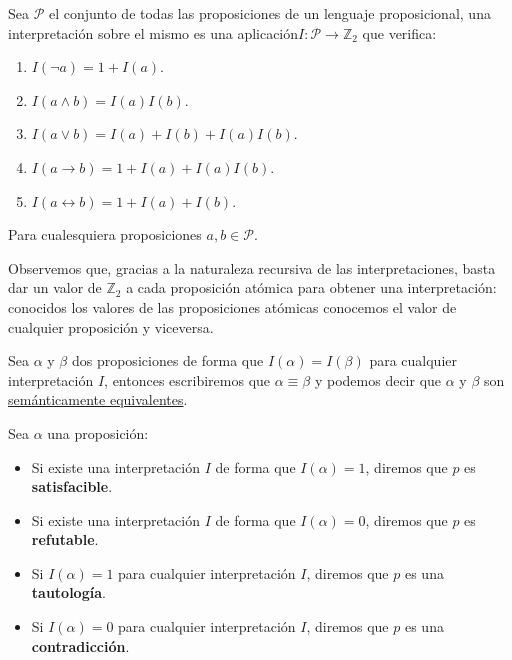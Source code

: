 \begin{definicion}[Interpretación]
    Sea $\mathcal{P}$ el conjunto de todas las proposiciones de un lenguaje proposicional, una interpretación sobre el mismo es una aplicación\newline $I:\mathcal{P}\rightarrow\mathbb{Z}_2$ que verifica:
    \begin{enumerate}
        \item $I(\lnot a) = 1+ I(a)$.
        \item $I(a\land b) = I(a)I(b)$.
        \item $I(a\lor b) = I(a) + I(b) + I(a)I(b)$.
        \item $I(a\to b) = 1 + I(a) + I(a)I(b)$.
        \item $I(a\leftrightarrow b) = 1 + I(a) + I(b)$.
    \end{enumerate}
    Para cualesquiera proposiciones $a,b\in \mathcal{P}$.
\end{definicion}

\begin{observacion}
    Observemos que, gracias a la naturaleza recursiva de las interpretaciones, basta dar un valor de $\mathbb{Z}_2$ a cada proposición atómica para obtener una interpretación: conocidos los valores de las proposiciones atómicas conocemos el valor de cualquier proposición y viceversa.
\end{observacion}

\begin{definicion}
    Sea $\alpha$ y $\beta$ dos proposiciones de forma que $I(\alpha)=I(\beta)$ para cualquier interpretación $I$, entonces escribiremos que $\alpha\equiv\beta$ y podemos decir que $\alpha$ y $\beta$ son \underline{semánticamente equivalentes}.
\end{definicion}

\begin{definicion}
    Sea $\alpha$ una proposición: 
    \begin{itemize}
        \item Si existe una interpretación $I$ de forma que $I(\alpha)=1$, diremos que $p$ es \textbf{satisfacible}.
        \item Si existe una interpretación $I$ de forma que $I(\alpha)=0$, diremos que $p$ es \textbf{refutable}.
        \item Si $I(\alpha)=1$ para cualquier interpretación $I$, diremos que $p$ es una \textbf{tautología}.
        \item Si $I(\alpha)=0$ para cualquier interpretación $I$, diremos que $p$ es una \textbf{contradicción}.
    \end{itemize}
\end{definicion}

